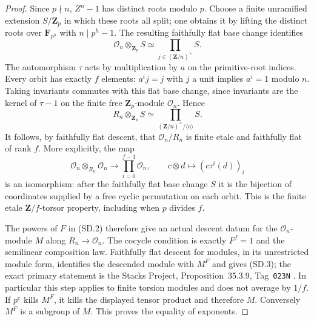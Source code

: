 \documentclass[11pt,a4paper]{article}
\begin{document}
\begin{proof}
Since $p\nmid n$, $Z^n-1$ has distinct roots modulo $p$.
Choose a finite unramified extension $S/\mathbf Z_p$ in which
these roots all split; one obtains it by lifting the distinct
roots over $\mathbf F_{p^h}$ with $n\mid p^h-1$.
The resulting faithfully flat base change identifies
\[
 \mathcal O_n\otimes_{\mathbf Z_p}S
                    \simeq\prod_{j\in(\mathbf Z/n)^\times} S.
 \tag{SD.4}
\]
The automorphism $\tau$ acts by multiplication by $a$ on the
primitive-root indices.  Every orbit has exactly $f$ elements:
$a^ij=j$ with $j$ a unit implies $a^i=1$ modulo $n$.
Taking invariants commutes with this flat base change, since
invariants are the kernel of $\tau-1$ on the finite free
$\mathbf Z_p$-module $\mathcal O_n$.  Hence
\[
 R_n\otimes_{\mathbf Z_p}S
       \simeq\prod_{(\mathbf Z/n)^\times/\langle a\rangle}S.
 \tag{SD.5}
\]
It follows, by faithfully flat descent, that
$\mathcal O_n/R_n$ is finite etale and faithfully flat of
rank $f$.  More explicitly, the map
\[
 \mathcal O_n\otimes_{R_n}\mathcal O_n
       \longrightarrow\prod_{i=0}^{f-1}\mathcal O_n,
 \qquad c\otimes d\longmapsto(c\tau^i(d))_i
 \tag{SD.6}
\]
is an isomorphism: after the faithfully flat base change $S$
it is the bijection of coordinates supplied by a free cyclic
permutation on each orbit.  This is the finite etale
$\mathbf Z/f$-torsor property, including when $p$ divides $f$.

The powers of $F$ in (SD.2) therefore give an actual descent
datum for the $\mathcal O_n$-module $M$ along $R_n\to\mathcal O_n$.
The cocycle condition is exactly $F^f=1$ and the semilinear
composition law.  Faithfully flat descent for modules, in its
unrestricted module form, identifies the descended module with
$M^F$ and gives (SD.3); the exact primary statement is the
Stacks Project, Proposition~35.3.9, Tag~\texttt{023N}
\cite{Stacks023N}.  In particular this step applies to finite
torsion modules and does not average by $1/f$.
If $p^e$ kills $M^F$, it kills the displayed tensor product and
therefore $M$.  Conversely $M^F$ is a subgroup of $M$.
This proves the equality of exponents.
\end{proof}
\end{document}
